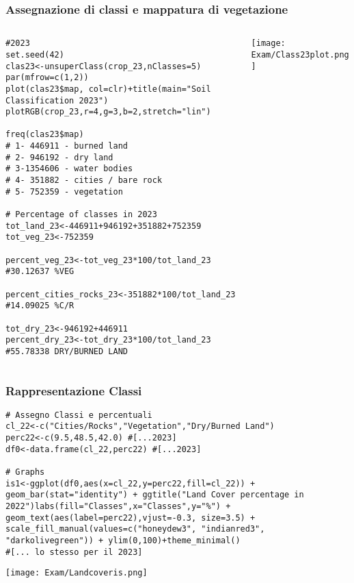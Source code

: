 \documentclass{beamer}  %
\begin{document}
\begin{frame}[fragile]
\frametitle{\scriptsize Assegnazione di classi e mappatura di vegetazione}
    \begin{columns}
        \begin{column}{0.45\textwidth}
            \begin{lstlisting}[style=mystyle]
#2023
set.seed(42) 
clas23<-unsuperClass(crop_23,nClasses=5)
par(mfrow=c(1,2))
plot(clas23$map, col=clr)+title(main="Soil Classification 2023")
plotRGB(crop_23,r=4,g=3,b=2,stretch="lin")

freq(clas23$map)
# 1- 446911 - burned land
# 2- 946192 - dry land
# 3-1354606 - water bodies
# 4- 351882 - cities / bare rock
# 5- 752359 - vegetation 

# Percentage of classes in 2023
tot_land_23<-446911+946192+351882+752359
tot_veg_23<-752359 

percent_veg_23<-tot_veg_23*100/tot_land_23 #30.12637 %VEG

percent_cities_rocks_23<-351882*100/tot_land_23 #14.09025 %C/R

tot_dry_23<-946192+446911
percent_dry_23<-tot_dry_23*100/tot_land_23 #55.78338 DRY/BURNED LAND

            \end{lstlisting}
        \end{column}
        
        \begin{column}{0.47\textwidth}
            \texttt{[image: Exam/Class23plot.png]}
        \end{column}
    \end{columns}

\end{frame}

\begin{frame}[fragile]
\frametitle{\scriptsize Rappresentazione Classi}
            \begin{lstlisting}[style=mystyle]
# Assegno Classi e percentuali
cl_22<-c("Cities/Rocks","Vegetation","Dry/Burned Land")
perc22<-c(9.5,48.5,42.0) #[...2023]
df0<-data.frame(cl_22,perc22) #[...2023]

# Graphs
is1<-ggplot(df0,aes(x=cl_22,y=perc22,fill=cl_22)) + geom_bar(stat="identity") + ggtitle("Land Cover percentage in 2022")labs(fill="Classes",x="Classes",y="%") + geom_text(aes(label=perc22),vjust=-0.3, size=3.5) + scale_fill_manual(values=c("honeydew3", "indianred3", "darkolivegreen")) + ylim(0,100)+theme_minimal()
#[... lo stesso per il 2023]

            \end{lstlisting}
        \vspace{0.5cm}
            \texttt{[image: Exam/Landcoveris.png]}

\end{frame}
\end{document}

